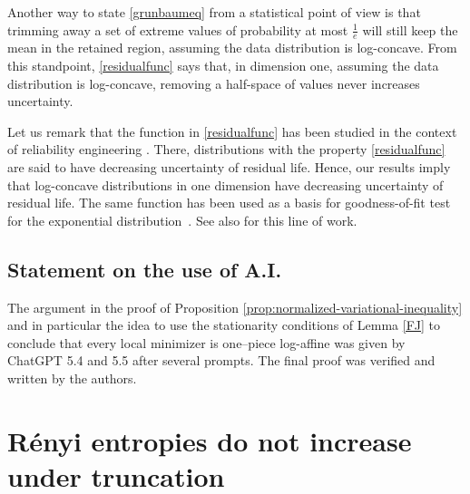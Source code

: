 \documentclass{article}
\theoremstyle{plain}
\theoremstyle{definition}
\newcommand{\1}{\mathbf 1}
\begin{document}
Another way to state \eqref{grunbaumeq} from a statistical point of view is that trimming away a set of extreme values of probability at most $\frac{1}{e}$ will still keep the mean in the retained region, assuming the data distribution is log-concave. From this standpoint, \eqref{residualfunc} says that, in dimension one, assuming the data distribution is log-concave, removing a half-space of values never increases uncertainty. 



Let us remark that the function in \eqref{residualfunc} has been studied in the context of reliability engineering \cite{residual}. There, distributions with the property \eqref{residualfunc} are said to have decreasing uncertainty of residual life. Hence, our results imply that log-concave distributions in one dimension have decreasing uncertainty of residual life. The same function has been used as a basis for goodness-of-fit test for the exponential distribution~\cite{goodness}. See also \cite{hazard, piraeus, testinglifetime, chernoffresidual, propertiesofShannon, raocumulative} for this line of work. 






\subsection*{Statement on the use of A.I.}

The argument in the proof of Proposition \ref{prop:normalized-variational-inequality} and in particular the idea to use the stationarity conditions of Lemma \ref{FJ} to conclude that every local minimizer is one--piece log-affine was given by ChatGPT 5.4 and 5.5 after several prompts. The final proof was verified and written by the authors. 

\section{R{\'e}nyi entropies do not increase under truncation} \label{grunbaumineqsec}
\end{document}
